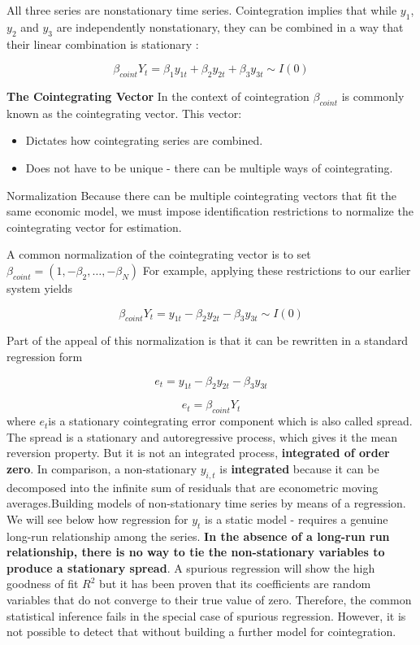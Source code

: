 \documentclass[a4paper, 11pt]{article}
\begin{document}
All three series are nonstationary time series.
Cointegration implies that while $y_1$,$y_2$ and $y_3$ are independently nonstationary, they can be combined in a way that their linear combination is stationary :

$$\beta_{coint} Y_t = \beta_1 y_{1t} + \beta_2 y_{2t} + \beta_3 y_{3t} \sim I(0)$$

\textbf{The Cointegrating Vector} In the context of cointegration $\beta_{coint} $ is commonly known as the cointegrating vector. This vector:

\begin{itemize}
\item Dictates how cointegrating series are combined.
\item Does not have to be unique - there can be multiple ways of cointegrating.
\end{itemize}

Normalization Because there can be multiple cointegrating vectors that fit the same economic model, we must impose identification restrictions to normalize the cointegrating vector for estimation.

A common normalization of the cointegrating vector is to set $\beta_{coint} = ( 1,  -\beta_2, \ldots, -\beta_N)$
For example, applying these restrictions to our earlier system yields

$$\beta_{coint} Y_t = y_{1t} - \beta_2 y_{2t} - \beta_3 y_{3t} \sim I(0)$$

Part of the appeal of this normalization is that it can be rewritten in a standard regression form

$$ e_t = y_{1t} - \beta_2 y_{2t} - \beta_3 y_{3t}$$

$$ e_t = \beta_{coint} Y_t $$
where $e_t$is a stationary cointegrating error component which is also called spread.\\

The spread is a stationary and autoregressive process, which gives it the mean reversion property. But it is not an integrated process, \textbf{integrated of order zero}. In comparison, a non-stationary $y_{i,t}$ is \textbf{integrated} because it can be decomposed into the infinite sum of residuals that are econometric moving averages.Building models of non-stationary time series by means of a regression. We will see below how regression for $y_t$ is a static model - requires a genuine long-run relationship among the series. \textbf{In the absence of a long-run run relationship, there is no way to tie the non-stationary variables to produce a stationary spread}. A spurious regression will show the high goodness of fit $R^2$ but it has been proven that its coefficients are random variables that do not converge to their true value of zero. Therefore, the common statistical inference fails in the special case of spurious regression. However, it is not possible to detect that without building a further model for cointegration.
\end{document}

